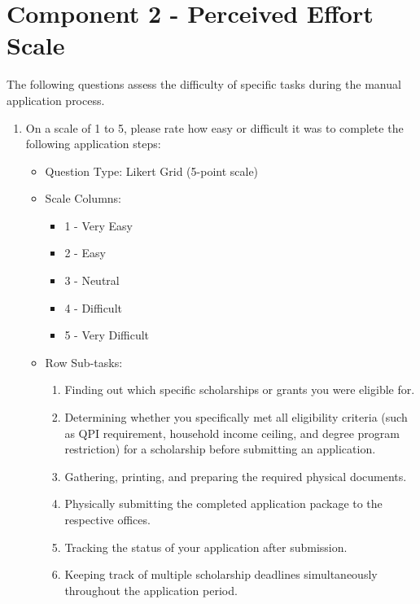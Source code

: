 \section{Component 2 - Perceived Effort Scale}

The following questions assess the difficulty of specific tasks during the manual application process.

\begin{enumerate}[resume=q, label={Question \arabic*:}, leftmargin=*, align=left]
  \item On a scale of 1 to 5, please rate how easy or difficult it was to complete the following application steps:
  \begin{itemize}[leftmargin=*]
    \item Question Type: Likert Grid (5-point scale)
    \item Scale Columns:
    \begin{itemize}[leftmargin=*]
      \item 1 - Very Easy
      \item 2 - Easy
      \item 3 - Neutral
      \item 4 - Difficult
      \item 5 - Very Difficult
    \end{itemize}
    \item Row Sub-tasks:
    \begin{enumerate}[label=\arabic*., leftmargin=*]
      \item Finding out which specific scholarships or grants you were eligible for.
      \item Determining whether you specifically met all eligibility criteria (such as QPI requirement, household income ceiling, and degree program restriction) for a scholarship before submitting an application.
      \item Gathering, printing, and preparing the required physical documents.
      \item Physically submitting the completed application package to the respective offices.
      \item Tracking the status of your application after submission.
      \item Keeping track of multiple scholarship deadlines simultaneously throughout the application period.
    \end{enumerate}
  \end{itemize}
\end{enumerate}

